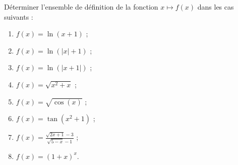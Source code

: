 
\begin{exercice}[\minsyndical]\label{exoTD1_1}

Déterminer l'ensemble de définition de la fonction $x\mapsto f(x)$ dans les cas suivants :
\begin{enumerate}
\item 
  $\displaystyle f(x)=\ln (x+1)$ ;
  \item
    $\displaystyle f(x)=\ln (|x|+1)$ ;
    \item 
      $\displaystyle f(x)=\ln (|x+1|)$ ;
      \item 
        $\displaystyle f(x)=\sqrt{x^2+x}$ ;
        \item
          $\displaystyle f(x)=\sqrt{\cos (x)}$ ;
          \item 
            $\displaystyle f(x)=\tan(x^2+1)$ ;
            \item
              $\displaystyle f(x)=\frac{\sqrt{2x+1}-3}{\sqrt{5-x}-1}$ ;
              \item
                $\displaystyle f(x)=(1+x)^x$.
\end{enumerate}

  
\end{exercice}
